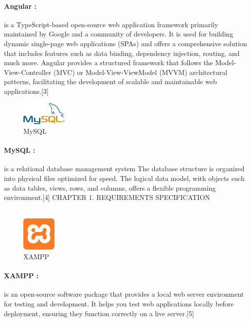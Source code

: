 \documentclass{article}
\begin{document}
\paragraph{Angular :} 
is a TypeScript-based open-source web application framework primarily maintained by Google and a community of developers. It is used for building dynamic single-page web applications (SPAs) and offers a comprehensive solution that includes features such as data binding, dependency injection, routing, and much more. Angular provides a structured framework that follows the Model-View-Controller (MVC) or Model-View-ViewModel (MVVM) architectural patterns, facilitating the development of scalable and maintainable web applications.[3]
\vspace{1cm}

\begin{figure}[htbp]
    \centering
    \includegraphics[width=0.2\textwidth]{aaaa}
    \caption{MySQL}
    \label{fig:design4}
\end{figure}
\paragraph{MySQL :} 
is a relational database management system
The database structure is organized into physical files optimized for speed. The logical data model, with objects such as data tables, views, rows, and columns, offers a flexible programming environment.[4]
\vspace{1cm} 
\newpage
\noindent
CHAPTER 1.  REQUIREMENTS SPECIFICATION \\
\underline{\hspace{\textwidth}} \vspace{0.2cm}\\
\begin{figure}[htbp]
    \centering
    \includegraphics[width=0.15\textwidth]{fff}
    \caption{XAMPP }
    \label{fig:design5}
\end{figure}
\paragraph{XAMPP :} 
is an open-source software package that provides a local web server environment for testing and development. It helps you test web applications locally before deployment, ensuring they function correctly on a live server.[5]
\vspace{1cm}
\end{document}

